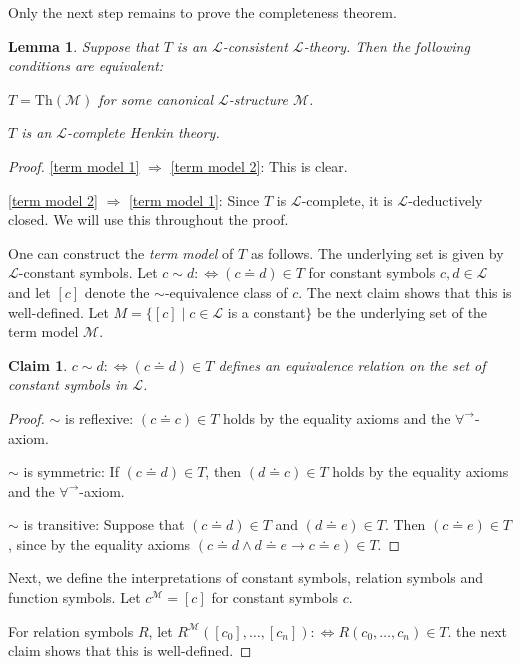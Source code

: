 \documentclass[a4paper, 11pt]{amsart}
\newtheorem{lemma}[lemma]{Lemma}
\newtheorem*{claim*}{Claim}
\theoremstyle{remark}
\newcommand{\Th}{\mathrm{Th}}
\newcommand{\cL}{\mathcal L}
\newcommand{\cM}{\mathcal M}
\newenvironment{enumerate-(1)}{\begin{enumerate}[label={\upshape (\arabic*)}, leftmargin=2pc]}{\end{enumerate}}
\begin{document}
Only the next step remains to prove the completeness theorem. 


\begin{lemma} 
\label{term model} 
Suppose that $T$ is an $\cL$-consistent $\cL$-theory. 
Then the following conditions are equivalent: 
\begin{enumerate-(1)} 
\item 
\label{term model 1}  
$T=\Th(\cM)$ for some canonical $\cL$-structure $\cM$. 
\item 
\label{term model 2}  
$T$ is an $\cL$-complete Henkin theory.
\end{enumerate-(1)} 
\end{lemma} 
\begin{proof} 
\ref{term model 1} $\Longrightarrow$ \ref{term model 2}: This is clear. 

\ref{term model 2} $\Longrightarrow$ \ref{term model 1}: 
Since $T$ is $\cL$-complete, it is $\cL$-deductively closed. We will use this throughout the proof. 

One can construct the \emph{term model} of $T$ as follows. The underlying set is given by $\cL$-constant symbols. 
Let $c \sim d : \Leftrightarrow  (c\doteq d)\in T$ for constant symbols $c,d\in \cL$ and let $[c]$ denote the $\sim$-equivalence class of $c$. 
The next claim shows that this is well-defined. 
Let $M=\{ [c] \mid c\in \cL$ is a constant$\}$ be the underlying set of the term model $\cM$.  


\begin{claim*}
$c \sim d : \Leftrightarrow  (c\doteq d)\in T$ defines an equivalence relation on the set of constant symbols in $\cL$. 
\end{claim*} 
\begin{proof} 
$\sim $ is reflexive: $(c\doteq c)\in T$ holds by the equality axioms and the $\forall^\rightarrow$-axiom. 
 
$\sim $ is symmetric: If $(c\doteq d)\in T$, then $(d\doteq c)\in T$ holds by the equality axioms and the $\forall^\rightarrow$-axiom. 

$\sim $ is transitive: Suppose that $(c\doteq d)\in T$ and $(d\doteq e)\in T$. 
Then $(c\doteq e)\in T$, since by the equality axioms $(c\doteq d \wedge d\doteq e \rightarrow c\doteq e)\in T$. 
\end{proof} 


Next, we define the interpretations of constant symbols, relation symbols and function symbols. 
Let $c^{\cM}=[c]$ for constant symbols $c$. 

For relation symbols $R$, let $R^{\cM}([c_0],\dots, [c_n]) :\Longleftrightarrow R(c_0,\dots, c_n) \in T$. 
the next claim shows that this is well-defined. 


\end{proof}
\end{document}
